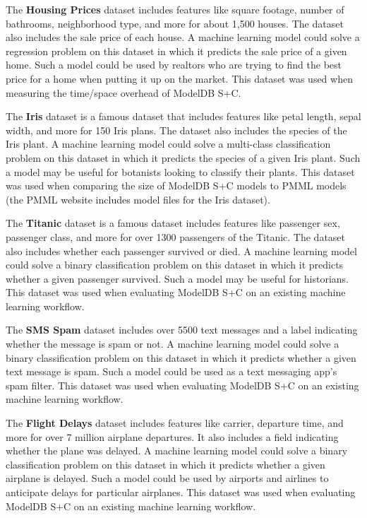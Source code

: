 The \textbf{Housing Prices} dataset \cite{housing} includes features like square
footage, number of bathrooms, neighborhood type, and more for about 1,500 houses.
The dataset also includes the sale price of each house. A machine learning model
could solve a regression problem on this dataset in which it predicts the sale
price of a given home. Such a model could be used by realtors who
are trying to find the best price for a home when putting it up on the market. This
dataset was used when measuring the time/space overhead of ModelDB S+C.

The \textbf{Iris} dataset \cite{iris} is a famous dataset that includes features
like petal length, sepal width, and more for 150 Iris plans. The dataset also
includes the species of the Iris plant. A machine learning model could solve a 
multi-class classification problem on this dataset in which it predicts the species
of a given Iris plant. Such a model may be useful for botanists looking to classify
their plants. This dataset was used when comparing the size of ModelDB S+C models
to PMML models (the PMML website includes model files for the Iris dataset).

The \textbf{Titanic} dataset \cite{titanic} is a famous dataset includes features like 
passenger sex, passenger class, and more for over 1300 passengers of the Titanic. 
The dataset also includes whether each passenger survived or died. A machine learning
model could solve a binary classification problem on this dataset in which it predicts whether
a given passenger survived. Such a model may be useful for historians. This dataset
was used when evaluating ModelDB S+C on an existing machine learning workflow.

The \textbf{SMS Spam} dataset \cite{spam} includes over 5500 text messages and
a label indicating whether the message is spam or not. A machine learning model
could solve a binary classification problem on this dataset in which it predicts
whether a given text message is spam. Such a model could be used as a text messaging
app's spam filter. This dataset was used when evaluating ModelDB S+C on an existing
machine learning workflow.

The \textbf{Flight Delays} dataset \cite{airline} includes features like carrier, departure
time, and more for over 7 million airplane departures. It also includes a field indicating whether
the plane was delayed. A machine learning model could solve a binary classification problem on this dataset in which
it predicts whether a given airplane is delayed. Such a model could be used by airports and airlines
to anticipate delays for particular airplanes. This dataset was used when evaluating ModelDB S+C
on an existing machine learning workflow.

